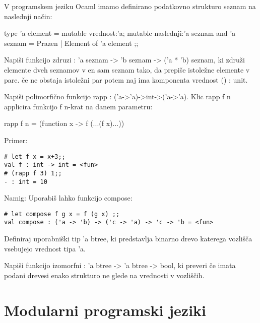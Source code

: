 \begin{ex}
  V programskem jeziku Ocaml imamo definirano podatkovno strukturo
  seznam na naslednji na\v cin:

  type 'a element = { 
     mutable vrednost:'a; 
     mutable naslednji:'a seznam 
  } 
  and 'a seznam = Prazen | Element of 'a element ;; 

  Napi\v si funkcijo zdruzi : 'a seznam -> 'b seznam -> ('a * 'b)
  seznam, ki zdru\v zi elemente dveh seznamov v en sam seznam tako, da
  prepi\v se istole\v zne elemente v pare. \v ce ne obstaja istole\v
  zni par potem naj ima komponenta vrednost () : unit.
\end{ex} 



\begin{ex}
  Napi\v si polimorfi\v cno funkcijo rapp :
  ('a->'a)->int->('a->'a). Klic rapp f n applicira funkcijo f n-krat
  na danem parametru:

  rapp f n = (function x -> f (...(f x)...))     

\noindent\/Primer:            
\begin{lstlisting}
# let f x = x+3;; 
val f : int -> int = <fun> 
# (rapp f 3) 1;; 
- : int = 10 

\end{lstlisting}

Namig: Uporabi\v s lahko funkcijo compose:

\begin{lstlisting}
# let compose f g x = f (g x) ;; 
val compose : ('a -> 'b) -> ('c -> 'a) -> 'c -> 'b = <fun> 
\end{lstlisting}
\end{ex} 



\begin{ex}
  Definiraj uporabni\v ski tip 'a btree, ki predstavlja binarno drevo
  katerega vozli\v s\v ca vsebujejo vrednost tipa 'a.

  Napi\v si funkcijo izomorfni : 'a btree -> 'a btree -> bool, ki
  preveri \v ce imata podani drevesi enako strukturo ne glede na
  vrednosti v vozli\v s\v cih.


\end{ex} 




\chapter{Modularni programski jeziki}

